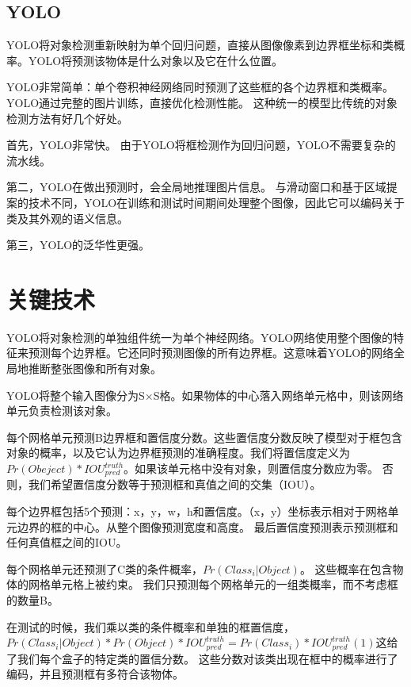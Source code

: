 \subsection{YOLO\cite{yolo}}{
YOLO将对象检测重新映射为单个回归问题，直接从图像像素到边界框坐标和类概率。YOLO将预测该物体是什么对象以及它在什么位置。

YOLO非常简单：单个卷积神经网络同时预测了这些框的各个边界框和类概率。YOLO通过完整的图片训练，直接优化检测性能。 这种统一的模型比传统的对象检测方法有好几个好处。

首先，YOLO非常快。 由于YOLO将框检测作为回归问题，YOLO不需要复杂的流水线。

第二，YOLO在做出预测时，会全局地推理图片信息。 与滑动窗口和基于区域提案的技术不同，YOLO在训练和测试时间期间处理整个图像，因此它可以编码关于类及其外观的语义信息。

第三，YOLO的泛华性更强。
}

\section{关键技术}{
	YOLO将对象检测的单独组件统一为单个神经网络。YOLO网络使用整个图像的特征来预测每个边界框。它还同时预测图像的所有边界框。这意味着YOLO的网络全局地推断整张图像和所有对象。

	YOLO将整个输入图像分为S×S格。如果物体的中心落入网络单元格中，则该网络单元负责检测该对象。

	每个网格单元预测B边界框和置信度分数。这些置信度分数反映了模型对于框包含对象的概率，以及它认为边界框预测的准确程度。我们将置信度定义为$Pr(Obeject)*IOU_{pred}^{truth}$。如果该单元格中没有对象，则置信度分数应为零。 否则，我们希望置信度分数等于预测框和真值之间的交集（IOU）。

	每个边界框包括5个预测：x，y，w，h和置信度。（x，y）坐标表示相对于网格单元边界的框的中心。从整个图像预测宽度和高度。 最后置信度预测表示预测框和任何真值框之间的IOU。

	每个网格单元还预测了C类的条件概率，$Pr(Class_i|Object)$。 这些概率在包含物体的网格单元格上被约束。 我们只预测每个网格单元的一组类概率，而不考虑框的数量B。

	在测试的时候，我们乘以类的条件概率和单独的框置信度，$Pr(Class_i|Object)*Pr(Object)*IOU_{pred}^{truth}=Pr(Class_i)*IOU_{pred}^{truth} (1)$这给了我们每个盒子的特定类的置信分数。 这些分数对该类出现在框中的概率进行了编码，并且预测框有多符合该物体。
}

